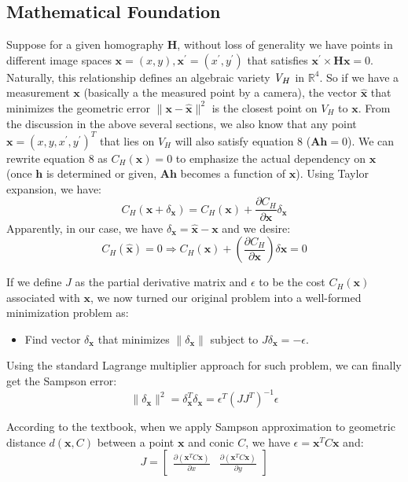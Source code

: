 \documentclass[conference]{IEEEtran}
\newcommand{\mat}[1]{\mathbf{#1}} %
\begin{document}
\subsection{Mathematical Foundation}
Suppose for a given homography $\mat{H}$, without loss of generality we have points in different image spaces $\mat{x} = (x, y), \mat{x}^\prime = (x^\prime, y^\prime)$ that satisfies $\mat{x}^\prime \times \mat{Hx} = 0$. Naturally, this relationship defines an algebraic variety $\emph{V}_H$ in $\mathbb{R}^4$. So if we have a measurement $\mat{x}$ (basically a the measured point by a camera), the vector $\hat{\mat{x}}$ that minimizes the geometric error $\|\mat{x} - \hat{\mat{x}}\|^2$ is the closest point on $V_H$ to $\mat{x}$. From the discussion in the above several sections, we also know that any point $\mat{x} = (x, y, x^\prime, y^\prime)^T$ that lies on $V_H$ will also satisfy equation 8 ($\mat{A}\mat{h} = 0$). We can rewrite equation 8 as $C_H(\mat{x}) = 0$ to emphasize the actual dependency on $\mat{x}$ (once $\mat{h}$ is determined or given, $\mat{A}\mat{h}$ becomes a function of $\mat{x}$). Using Taylor expansion, we have:
\begin{equation}
	C_H(\mat{x} + \delta_{\mat{x}}) = C_H(\mat{x}) + \frac{\partial C_H}{\partial \mat{x}}\delta_{\mat{x}}
\end{equation}
Apparently, in our case, we have $\delta _{\mat{x}} = \hat{\mat{x}} - \mat{x}$ and we desire:
\begin{equation}
	C_H(\hat{\mat{x}}) = 0 \Rightarrow C_H(\mat{x}) + (\frac{\partial C_H}{\partial \mat{x}})\delta \mat{x} = 0
\end{equation}

If we define $J$ as the partial derivative matrix and $\epsilon$ to be the cost $C_H(\mat{x})$ associated with $\mat{x}$, we now turned our original problem into a well-formed minimization problem as:
\begin{itemize}
	\item Find vector $\delta _{\mat{x}}$ that minimizes $\|\delta _{\mat{x}}\|$ subject to $J\delta_{\mat{x}} = -\epsilon$.
\end{itemize}

Using the standard Lagrange multiplier approach for such problem, we can finally get the Sampson error:
\begin{equation}
	\|\delta _{\mat{x}}\|^2 = \delta_{\mat{x}}^T \delta_{\mat{x}} = \epsilon^T(JJ^{T})^{-1}\epsilon
\end{equation}

According to the textbook, when we apply Sampson approximation to geometric distance $d(\mat{x}, C)$ between a point $\mat{x}$ and conic $C$, we have $\epsilon = \mat{x}^TC\mat{x}$ and:
\begin{equation}
	J = \begin{bmatrix}
		\frac{\partial(\mat{x}^TC\mat{x})}{\partial x} & \frac{\partial(\mat{x}^TC\mat{x})}{\partial y}
	\end{bmatrix}
\end{equation}
\end{document}

